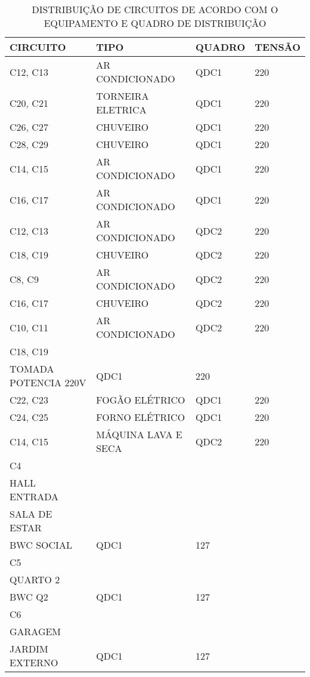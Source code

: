 \begin{longtable}{|l|l|l|l|}
	\caption{DISTRIBUIÇÃO DE CIRCUITOS DE ACORDO COM O EQUIPAMENTO E QUADRO DE DISTRIBUIÇÃO}
	\label{tab:distribuicao_circuitos}\\
	\hline
	CIRCUITO & TIPO & QUADRO & TENSÃO \\ \hline
	\endfirsthead
	\endhead
	C12, C13 & AR CONDICIONADO & QDC1 & 220 \\ \hline
	C20, C21 & TORNEIRA ELETRICA & QDC1 & 220 \\ \hline
	C26, C27 & CHUVEIRO & QDC1 & 220 \\ \hline
	C28, C29 & CHUVEIRO & QDC1 & 220 \\ \hline
	C14, C15 & AR CONDICIONADO & QDC1 & 220 \\ \hline
	C16, C17 & AR CONDICIONADO & QDC1 & 220 \\ \hline
	C12, C13 & AR CONDICIONADO & QDC2 & 220 \\ \hline
	C18, C19 & CHUVEIRO & QDC2 & 220 \\ \hline
	C8, C9 & AR CONDICIONADO & QDC2 & 220 \\ \hline
	C16, C17 & CHUVEIRO & QDC2 & 220 \\ \hline
	C10, C11 & AR CONDICIONADO & QDC2 & 220 \\ \hline
	C18, C19 & \begin{tabular}[c]{@{}l@{}}MOTOR PORTÃO\\ TOMADA POTENCIA 220V\end{tabular} & QDC1 & 220 \\ \hline
	C22, C23 & FOGÃO ELÉTRICO & QDC1 & 220 \\ \hline
	C24, C25 & FORNO ELÉTRICO & QDC1 & 220 \\ \hline
	C14, C15 & MÁQUINA LAVA E SECA & QDC2 & 220 \\ \hline
	C4 & \begin{tabular}[c]{@{}l@{}}TUG \\ HALL ENTRADA\\ SALA DE ESTAR\\ BWC SOCIAL\end{tabular} & QDC1 & 127 \\ \hline
	C5 & \begin{tabular}[c]{@{}l@{}}TUG \\ QUARTO 2\\ BWC Q2\end{tabular} & QDC1 & 127 \\ \hline
	C6 & \begin{tabular}[c]{@{}l@{}}TUG\\ GARAGEM\\ JARDIM EXTERNO\end{tabular} & QDC1 & 127 \\ \hline

\end{longtable}
